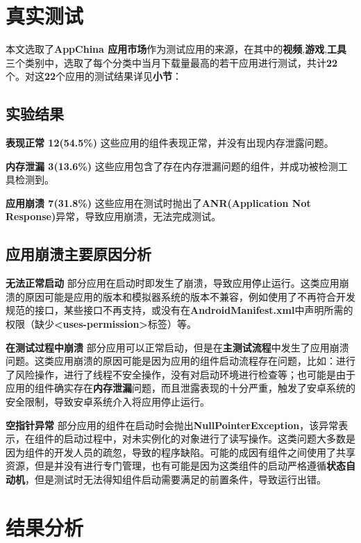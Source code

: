 \newpage
\section{真实测试}


本文选取了\textbf{AppChina 应用市场}\cite{appchina}作为测试应用的来源，在其中的\textbf{视频},\textbf{游戏},\textbf{工具}三个类别中，选取了每个分类中当月下载量最高的若干应用进行测试，共计\textbf{22}个。对这\textbf{22}个应用的测试结果详见\textbf{\redbf{\ref{now-result}}小节}：

\subsection{实验结果}\label{now-result}
\textbf{表现正常 12(54.5\%) }这些应用的组件表现正常，并没有出现内存泄露问题。

\textbf{内存泄漏 3(13.6\%) }这些应用包含了存在内存泄漏问题的组件，并成功被检测工具检测到。

\textbf{应用崩溃 7(31.8\%) }这些应用在测试时抛出了\textbf{ANR(Application Not Response)}异常，导致应用崩溃，无法完成测试。

\subsection{应用崩溃主要原因分析}

\textbf{无法正常启动 } 部分应用在启动时即发生了崩溃，导致应用停止运行。这类应用崩溃的原因可能是应用的版本和模拟器系统的版本不兼容，例如使用了不再符合开发规范的接口，某些接口不再支持，或没有在\textbf{AndroidManifest.xml}中声明所需的权限（缺少\textbf{<uses-permission>}标签）等。

\textbf{在测试过程中崩溃 } 部分应用可以正常启动，但是在\textbf{主测试流程}中发生了应用崩溃问题。这类应用崩溃的原因可能是因为应用的组件启动流程存在问题，比如：进行了风险操作，进行了线程不安全操作，没有对启动环境进行检查等；也可能是由于应用的组件确实存在\textbf{内存泄漏}问题，而且泄露表现的十分严重，触发了安卓系统的安全限制，导致安卓系统介入将应用停止运行。

\textbf{空指针异常 } 部分应用的组件在启动时会抛出\textbf{NullPointerException}，该异常表示，在组件的启动过程中，对未实例化的对象进行了读写操作。这类问题大多数是因为组件的开发人员的疏忽，导致的程序缺陷。可能的成因有组件之间使用了共享资源，但是并没有进行专门管理，也有可能是因为这类组件的启动严格遵循\textbf{状态自动机}，但是测试时无法得知组件启动需要满足的前置条件，导致运行出错。

\section{结果分析}

